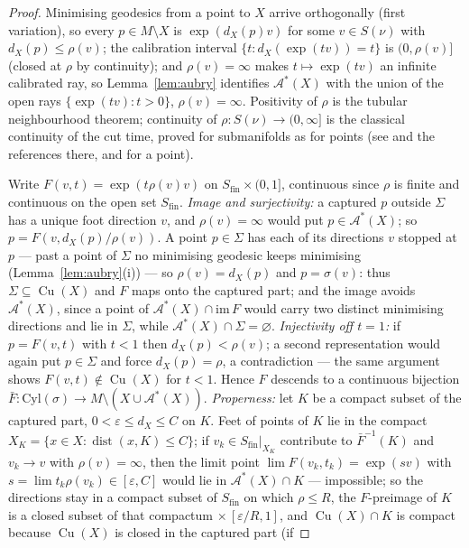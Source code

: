 \documentclass[11pt]{article}
\theoremstyle{remark}
\newcommand{\X}{X}
\newcommand{\dist}{\operatorname{dist}}
\newcommand{\dX}{d_{\X}}
\newcommand{\Aub}{\mathcal{A}^{\ast}}
\newcommand{\Cu}{\operatorname{Cu}}
\begin{document}
\begin{proof}
Minimising geodesics from a point to $\X$ arrive orthogonally
(first variation), so every $p\in M\setminus\X$ is
$\exp(\dX(p)v)$ for some $v\in S(\nu)$ with $\dX(p)\le\rho(v)$;
the calibration interval $\{t:\dX(\exp(tv))=t\}$ is $(0,\rho(v)]$
(closed at $\rho$ by continuity); and $\rho(v)=\infty$ makes
$t\mapsto\exp(tv)$ an infinite calibrated ray, so
Lemma~\ref{lem:aubry} identifies $\Aub(\X)$ with the union of the
open rays $\{\exp(tv):t>0\}$, $\rho(v)=\infty$. Positivity of
$\rho$ is the tubular neighbourhood theorem; continuity of
$\rho:S(\nu)\to(0,\infty]$ is the classical continuity of the cut
time, proved for submanifolds as for points (see \cite{BP} and the
references there, and \cite[III.4]{Sak} for a point).

Write $F(v,t)=\exp(t\rho(v)v)$ on $S_{\mathrm{fin}}\times(0,1]$,
continuous since $\rho$ is finite and continuous on the open set
$S_{\mathrm{fin}}$. \emph{Image and surjectivity:} a captured $p$
outside $\Sigma$ has a unique foot direction $v$, and
$\rho(v)=\infty$ would put $p\in\Aub(\X)$; so
$p=F(v,\dX(p)/\rho(v))$. A point $p\in\Sigma$ has each of its
directions $v$ stopped at $p$ --- past a point of $\Sigma$ no
minimising geodesic keeps minimising
(Lemma~\ref{lem:aubry}(i)) --- so $\rho(v)=\dX(p)$ and
$p=\sigma(v)$: thus $\Sigma\subseteq\Cu(\X)$ and $F$ maps onto the
captured part; and the image avoids $\Aub(\X)$, since a point of
$\Aub(\X)\cap\mathrm{im}\,F$ would carry two distinct minimising
directions and lie in $\Sigma$, while
$\Aub(\X)\cap\Sigma=\varnothing$. \emph{Injectivity off $t=1$:} if
$p=F(v,t)$ with $t<1$ then $\dX(p)<\rho(v)$; a second
representation would again put $p\in\Sigma$ and force
$\dX(p)=\rho$, a contradiction --- the same argument shows
$F(v,t)\notin\Cu(\X)$ for $t<1$. Hence $F$ descends to a
continuous bijection
$\bar F:\mathrm{Cyl}(\sigma)\to
M\setminus(\X\cup\Aub(\X))$. \emph{Properness:} let $K$ be a
compact subset of the captured part, $0<\varepsilon\le\dX\le C$ on
$K$. Feet of points of $K$ lie in the compact
$\X_{K}=\{x\in\X:\dist(x,K)\le C\}$; if $v_{k}\in
S_{\mathrm{fin}}|_{\X_{K}}$ contribute to $\bar F^{-1}(K)$ and
$v_{k}\to v$ with $\rho(v)=\infty$, then the limit point
$\lim F(v_{k},t_{k})=\exp(sv)$ with
$s=\lim t_{k}\rho(v_{k})\in[\varepsilon,C]$ would lie in
$\Aub(\X)\cap K$ --- impossible; so the directions stay in a
compact subset of $S_{\mathrm{fin}}$ on which $\rho\le R$, the
$F$-preimage of $K$ is a closed subset of that compactum
$\times\,[\varepsilon/R,1]$, and $\Cu(\X)\cap K$ is compact
because $\Cu(\X)$ is closed in the captured part (if

\end{proof}
\end{document}
